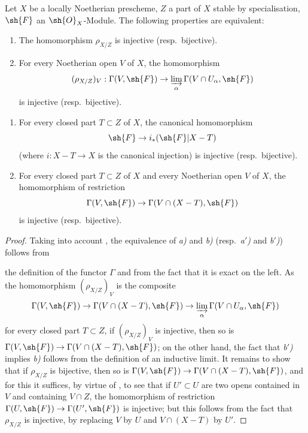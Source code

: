 \begin{proposition}[5.9.8]
\label{IV.5.9.8}
Let $X$ be a locally Noetherian prescheme, $Z$ a part of $X$ stable by specialisation, $\sh{F}$ an $\sh{O}_X$-Module.
The following properties are equivalent:
\begin{enumerate}[label=\emph{\alph*)}]
  \item The homomorphism $\rho_{X/Z}$  is injective (resp.\ bijective).
  \item For every Noetherian open $V$ of $X$, the homomorphism
\[
  (\rho_{X/Z})_V:\Gamma(V,\sh{F})\to\varinjlim_\alpha\Gamma(V\cap U_\alpha,\sh{F})
\]
is injective (resp.\ bijective).
\end{enumerate}
\begin{enumerate}
  \item[\rm a${}'$)] For every closed part $T\subset Z$ of $X$, the canonical homomorphism 
\[
  \sh{F}\to i_*(\sh{F}|X-T)
\]
(where $i:X-T\to X$ is the canonical injection) is injective (resp.\ bijective).
  \item[\rm b${}'$)] For every closed part $T\subset Z$ of $X$ and every Noetherian open $V$ of $X$, the homomorphism of restriction
\[
  \Gamma(V,\sh{F})\to\Gamma(V\cap(X-T),\sh{F})
\]
is injective (resp.\ bijective).
\end{enumerate}
\end{proposition}

\begin{proof}
Taking into account , the equivalence of \emph{a)} and \emph{b)} (resp.\ \emph{a${}'$)} and \emph{b${}'$)}) follows from


the definition of the functor $\Gamma$ and from the fact that it is exact on the left.
As the homomorphism $(\rho_{X/Z})_V$ is the composite
\[
  \Gamma(V,\sh{F})\to\Gamma(V\cap(X-T),\sh{F})\to\varinjlim_\alpha\Gamma(V\cap U_\alpha,\sh{F})
\]
for every closed part $T\subset Z$, if $(\rho_{X/Z})_V$ is injective, then so is $\Gamma(V,\sh{F})\to\Gamma(V\cap(X-T),\sh{F})$; on the other hand, the fact that \emph{b${}'$)} implies \emph{b)} follows from the definition of an inductive limit.
It remains to show that if $\rho_{X/Z}$ is bijective, then so is $\Gamma(V,\sh{F})\to\Gamma(V\cap(X-T),\sh{F})$, and for this it suffices, by virtue of , to see that if $U'\subset U$ are two opens contained in $V$ and containing $V\cap Z$, the homomorphism of restriction $\Gamma(U,\sh{F})\to\Gamma(U',\sh{F})$ is injective; but this follows from the fact that $\rho_{X/Z}$ is injective, by replacing $V$ by $U$ and $V\cap(X-T)$ by $U'$.
\end{proof}

